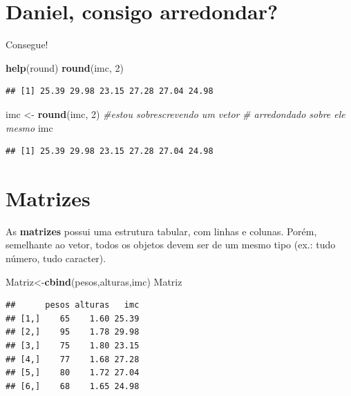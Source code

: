\documentclass[
]{article}
\newenvironment{Shaded}{\begin{snugshade}}{\end{snugshade}}
\newcommand{\CommentTok}[1]{\textcolor[rgb]{0.56,0.35,0.01}{\textit{#1}}}
\newcommand{\DecValTok}[1]{\textcolor[rgb]{0.00,0.00,0.81}{#1}}
\newcommand{\KeywordTok}[1]{\textcolor[rgb]{0.13,0.29,0.53}{\textbf{#1}}}
\newcommand{\NormalTok}[1]{#1}
\newcommand{\StringTok}[1]{\textcolor[rgb]{0.31,0.60,0.02}{#1}}
\begin{document}
\hypertarget{daniel-consigo-arredondar}{%
\section{Daniel, consigo arredondar?}\label{daniel-consigo-arredondar}}

Consegue!

\begin{Shaded}
\begin{Highlighting}[]
\KeywordTok{help}\NormalTok{(round)}
\KeywordTok{round}\NormalTok{(imc, }\DecValTok{2}\NormalTok{)}
\end{Highlighting}
\end{Shaded}

\begin{verbatim}
## [1] 25.39 29.98 23.15 27.28 27.04 24.98
\end{verbatim}

\begin{Shaded}
\begin{Highlighting}[]
\NormalTok{imc <-}\StringTok{ }\KeywordTok{round}\NormalTok{(imc, }\DecValTok{2}\NormalTok{) }\CommentTok{#estou sobrescrevendo um vetor}
\CommentTok{# arredondado sobre ele mesmo}
\NormalTok{imc}
\end{Highlighting}
\end{Shaded}

\begin{verbatim}
## [1] 25.39 29.98 23.15 27.28 27.04 24.98
\end{verbatim}

\hypertarget{matrizes}{%
\section{Matrizes}\label{matrizes}}

As \textbf{matrizes} possui uma estrutura tabular, com linhas e colunas.
Porém, semelhante ao vetor, todos os objetos devem ser de um mesmo tipo
(ex.: tudo número, tudo caracter).

\begin{Shaded}
\begin{Highlighting}[]
\NormalTok{Matriz<-}\KeywordTok{cbind}\NormalTok{(pesos,alturas,imc)}
\NormalTok{Matriz}
\end{Highlighting}
\end{Shaded}

\begin{verbatim}
##      pesos alturas   imc
## [1,]    65    1.60 25.39
## [2,]    95    1.78 29.98
## [3,]    75    1.80 23.15
## [4,]    77    1.68 27.28
## [5,]    80    1.72 27.04
## [6,]    68    1.65 24.98
\end{verbatim}
\end{document}
